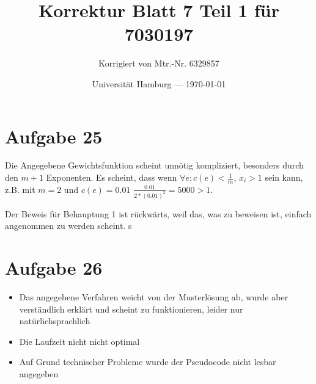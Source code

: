 \documentclass[parskip=half,a4paper]{scrartcl}
\title{Korrektur Blatt 7 Teil 1 für 7030197}
\author{Korrigiert von Mtr.-Nr. 6329857}
\date{Universität Hamburg --- \today}
\begin{document}
\maketitle %


\section{Aufgabe 25}

Die Angegebene Gewichtsfunktion scheint unnötig kompliziert, besonders durch den $m+1$ Exponenten. Es scheint, dass wenn $\forall e: c(e) < \frac{1}{m}$, $x_i > 1$ sein kann, z.B. mit $m=2$ und $c(e) = 0.01$ $\frac{0.01}{2 * (0.01) ^ 3} = 5000 > 1$.

Der Beweis für Behauptung 1 ist rückwärts, weil das, was zu beweisen ist, einfach angenommen zu werden scheint.
s
\section{Aufgabe 26}

\begin{itemize}
    \item Das angegebene Verfahren weicht von der Musterlösung ab, wurde aber verständlich erklärt und scheint zu funktionieren, leider nur natürlichsprachlich
    \item Die Laufzeit nicht nicht optimal
    \item Auf Grund technischer Probleme wurde der Pseudocode nicht lesbar angegeben
\end{itemize}
\end{document}
